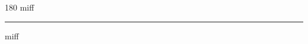
\begin{frame}
\begin{center}
\begin{turn}{180}
{\fontsize{2.5cm}{1em}\selectfont miff}
\end{turn}
\vspace{1em}\par  
\hrule
\vspace{1em}\par  
{\fontsize{2.5cm}{1em}\selectfont miff}
\end{center}
\end{frame}

